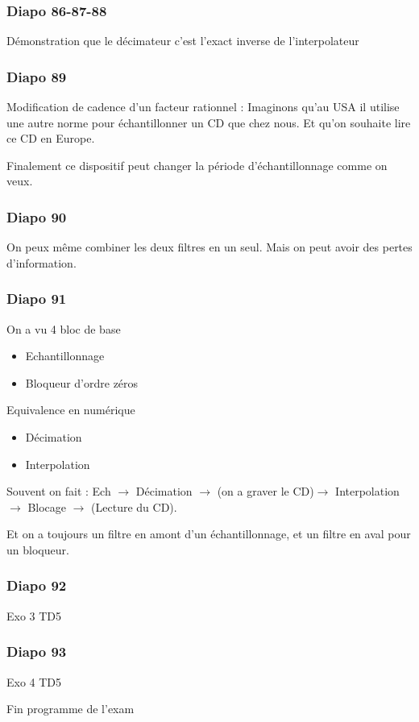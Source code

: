 \documentclass{article}
\theoremstyle{plain}%
\theoremstyle{definition}
\theoremstyle{remark}
\begin{document}
\subsubsection{Diapo 86-87-88}
Démonstration que le décimateur c'est l'exact inverse de l'interpolateur

\subsubsection{Diapo 89}
Modification de cadence d'un facteur rationnel : Imaginons qu'au USA il utilise une autre norme pour échantillonner un CD que chez nous. Et qu'on souhaite lire ce CD en Europe.

Finalement ce dispositif peut changer la période d'échantillonnage comme on veux.

\subsubsection{Diapo 90}
On peux même combiner les deux filtres en un seul. Mais on peut avoir des pertes d'information. 

\subsubsection{Diapo 91}
On a vu 4 bloc de base \begin{itemize}
    \item Echantillonnage 
    \item Bloqueur d'ordre zéros
\end{itemize}
Equivalence en numérique \begin{itemize}
    \item Décimation
    \item Interpolation
\end{itemize}
Souvent on fait : Ech $\rightarrow$ Décimation $\rightarrow$ (on a graver le CD)$\rightarrow$ Interpolation $\rightarrow$ Blocage $\rightarrow$ (Lecture du CD).

Et on a toujours un filtre en amont d'un échantillonnage, et un filtre en aval pour un bloqueur.

\subsubsection{Diapo 92}
Exo 3 TD5 

\subsubsection{Diapo 93}
Exo 4 TD5 

Fin programme de l'exam
\end{document}
